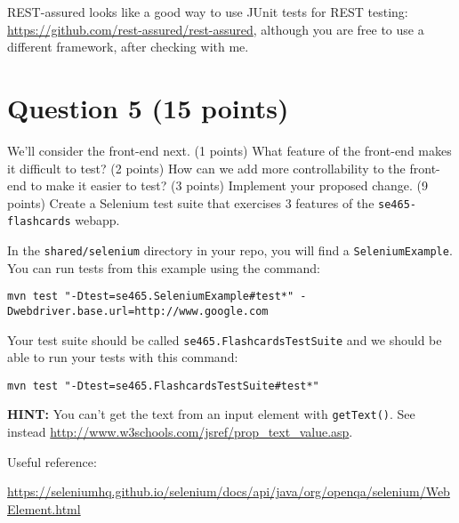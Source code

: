 \documentclass[10pt,hidelinks]{article}
\begin{document}
REST-assured looks like a good way to use JUnit tests for REST
testing: \url{https://github.com/rest-assured/rest-assured}, although
you are free to use a different framework, after checking with me.

\section*{Question 5 (15 points)}
We'll consider the front-end next. (1 points) What feature of the front-end
makes it difficult to test? (2 points) How can we add more controllability
to the front-end to make it easier to test? (3 points) Implement your proposed
change. (9 points) Create a Selenium test suite that exercises 3 features of the
{\tt se465-flashcards} webapp.

In the {\tt shared/selenium} directory in your repo, you will find a {\tt SeleniumExample}.
You can run tests from this example using the command:

\begin{verbatim}
mvn test "-Dtest=se465.SeleniumExample#test*" -Dwebdriver.base.url=http://www.google.com
\end{verbatim}

Your test suite should be called {\tt se465.FlashcardsTestSuite} and we should be able to run your tests with this command:

\begin{verbatim}
mvn test "-Dtest=se465.FlashcardsTestSuite#test*"
\end{verbatim}

{\bf HINT:} You can't get the text from an input element with {\tt getText()}. See instead
\url{http://www.w3schools.com/jsref/prop_text_value.asp}.

Useful reference:

\url{https://seleniumhq.github.io/selenium/docs/api/java/org/openqa/selenium/WebElement.html}
\end{document}
